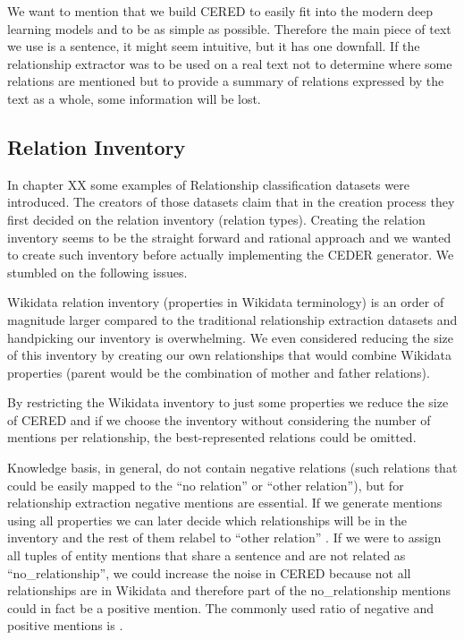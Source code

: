 We want to mention that we build CERED to easily fit into the modern deep learning models and to be as simple as possible. Therefore the main piece of text we use is a sentence, it might seem intuitive, but it has one downfall. If the relationship extractor was to be used on a real text not to determine where some relations are mentioned but to provide a summary of relations expressed by the text as a whole, some information will be lost. 

\subsection{Relation Inventory}
In chapter XX some examples of Relationship classification datasets were introduced. The creators of those datasets claim that in the creation process they first decided on the relation inventory (relation types).  Creating the relation inventory seems to be the straight forward and rational approach and we wanted to create such inventory before actually implementing the CEDER generator. We stumbled on the following issues.

Wikidata relation inventory (properties in Wikidata terminology) is an order of magnitude larger compared to the traditional relationship extraction datasets and handpicking our inventory is overwhelming. We even considered reducing the size of this inventory by creating our own relationships that would combine Wikidata properties (parent would be the combination of mother and father relations). 

By restricting the Wikidata inventory to just some properties we reduce the size of CERED and if we choose the inventory without considering the number of mentions per relationship, the best-represented relations could be omitted.

Knowledge basis, in general, do not contain negative relations (such relations that could be easily mapped to the “no relation” or “other relation”), but for relationship extraction negative mentions are essential. If we generate mentions using all properties we can later decide which relationships will be in the inventory and the rest of them relabel to “other relation” . If we were to assign all tuples of entity mentions that share a sentence and are not related as “no\_relationship”, we could increase the noise in CERED because not all relationships are in Wikidata and therefore part of the no\_relationship mentions could in fact be a positive mention. The commonly used ratio of negative and positive mentions is .

